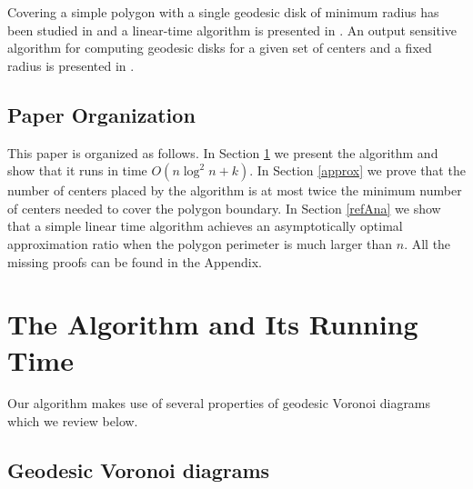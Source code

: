 \documentclass{llncs}
\begin{document}
{Covering a simple polygon with a single geodesic disk of minimum radius has been studied in \cite{pollackGeod} and a linear-time algorithm is presented in \cite{heeKapLinear}. {An output sensitive algorithm for computing geodesic disks for a given set of centers and a fixed radius is presented in \cite{geodPac}}. 

\subsection{Paper Organization}
This paper is organized as follows. In Section \ref{algoSec} we present the algorithm and show that it runs in time $O(n \log^2 n + k)$. In Section \ref{approx} we  {prove that the number of centers placed by the algorithm is at most twice the minimum number of centers needed to cover the polygon boundary}.  In Section \ref{refAna} we show that a simple linear time algorithm achieves an asymptotically optimal approximation ratio when the polygon perimeter is much larger than $n$. All the missing proofs can be found in the Appendix.
\section{The Algorithm and Its Running Time}
\label{algoSec}

Our algorithm makes use of several properties of geodesic Voronoi diagrams which we review below.


\subsection{Geodesic Voronoi diagrams}
\label{vorDia}

}
\end{document}
